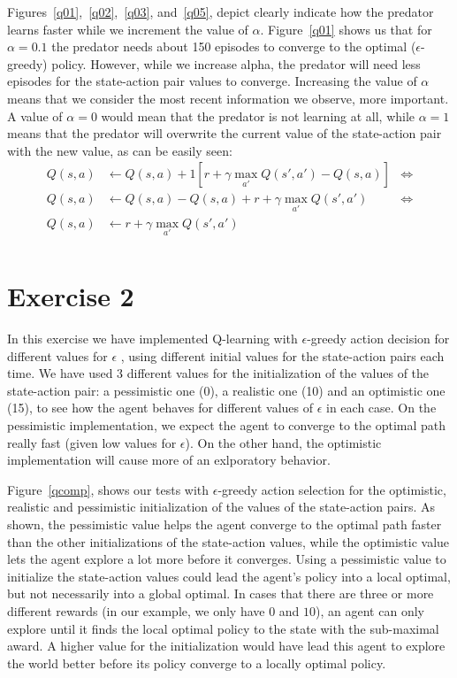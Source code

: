 \documentclass[a4paper,11pt]{article}
\begin{document}
Figures~\ref{q01},~\ref{q02},~\ref{q03}, and~\ref{q05}, depict clearly indicate how the predator learns faster while we increment the value of $\alpha$. Figure~\ref{q01} shows us that for $\alpha = 0.1$ the predator needs about 150 episodes to converge to the optimal ($\epsilon$-greedy) policy. However, while we increase alpha, the predator will need less episodes for the state-action pair values to converge. Increasing the value of $\alpha$ means that we consider the most recent information we observe, more important. A value of $\alpha = 0$ would mean that the predator is not learning at all, while $\alpha = 1$ means that the predator will overwrite the current value of the state-action pair with the new value, as can be easily seen:
\begin{align*}
  Q(s,a) &\leftarrow  Q(s,a) + 1 \left[ r + \gamma  \max_{a'} Q(s',a') - Q(s,a)\right] & \Longleftrightarrow\\
  Q(s,a) &\leftarrow  Q(s,a) - Q(s,a) + r + \gamma  \max_{a'} Q(s',a') & \Longleftrightarrow\\
  Q(s,a) &\leftarrow  r + \gamma  \max_{a'} Q(s',a') \\
\end{align*}
 
\section*{Exercise 2}

In this exercise we have implemented Q-learning with $\epsilon$-greedy action decision for different values for $\epsilon$ , using different initial values for the state-action pairs each time. We have used 3 different values for the initialization of the values of the state-action pair: a pessimistic one (0), a realistic one (10) and an optimistic one (15), to see how the agent behaves for different values of $\epsilon$ in each case. On the pessimistic implementation, we expect the agent to converge to the optimal path really fast (given low values for $\epsilon$). On the other hand, the optimistic implementation will cause more of an exlporatory behavior.


Figure~\ref{qcomp}, shows our tests with $\epsilon$-greedy action selection for the optimistic, realistic and pessimistic initialization of the values of the state-action pairs. As shown, the pessimistic value helps the agent converge to the optimal path faster than the other initializations of the state-action values, while the optimistic value lets the agent explore a lot more before it converges. Using a pessimistic value to initialize the state-action values could lead the agent's policy into a local optimal, but not necessarily into a global optimal. In cases that there are three or more different rewards (in our example, we only have $0$ and $10$), an agent can only explore until it finds the local optimal policy to the state with the sub-maximal award. A higher value for the initialization would have lead this agent to explore the world better before its policy converge to a locally optimal policy. 
\end{document}
